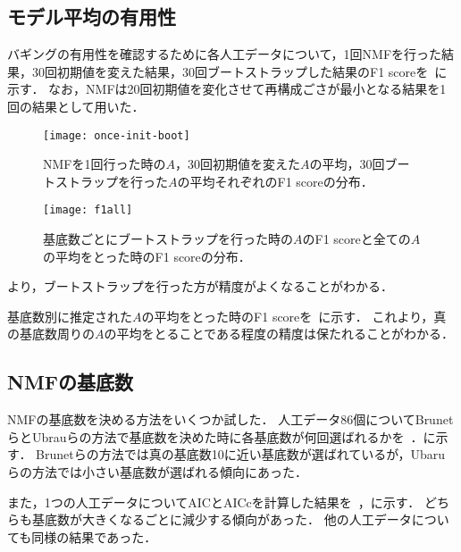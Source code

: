 \subsection{モデル平均の有用性}
バギングの有用性を確認するために各人工データについて，1回NMFを行った結果，30回初期値を変えた結果，30回ブートストラップした結果のF1 scoreを~に示す．
なお，NMFは20回初期値を変化させて再構成ごさが最小となる結果を1回の結果として用いた．
\begin{figure}[htbp]
    \begin{minipage}{0.5\hsize}
			\begin{center}
					\texttt{[image: once-init-boot]}
					\caption{NMFを1回行った時の$A$，30回初期値を変えた$A$の平均，30回ブートストラップを行った$A$の平均それぞれのF1 scoreの分布．}
					\label{fig:once-init-boot}
			\end{center}
		\end{minipage}
    \begin{minipage}{0.5\hsize}
			\begin{center}
					\texttt{[image: f1all]}
					\caption{基底数ごとにブートストラップを行った時の$A$のF1 scoreと全ての$A$の平均をとった時のF1 scoreの分布．}
					\label{fig:f1all}
			\end{center}
		\end{minipage}
\end{figure}
より，ブートストラップを行った方が精度がよくなることがわかる．

基底数別に推定された$A$の平均をとった時のF1 scoreを~に示す．
これより，真の基底数周りの$A$の平均をとることである程度の精度は保たれることがわかる．

\subsection{NMFの基底数}
NMFの基底数を決める方法をいくつか試した．
人工データ86個についてBrunetらとUbrauらの方法で基底数を決めた時に各基底数が何回選ばれるかを~．に示す．
Brunetらの方法では真の基底数10に近い基底数が選ばれているが，Ubaruらの方法では小さい基底数が選ばれる傾向にあった．

また，1つの人工データについてAICとAICcを計算した結果を~，に示す．
どちらも基底数が大きくなるごとに減少する傾向があった．
他の人工データについても同様の結果であった．

